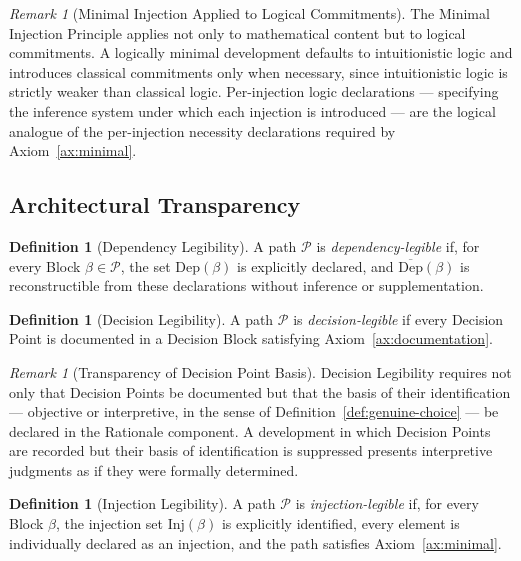 \documentclass[12pt, a4paper]{article}
\theoremstyle{plain}
\theoremstyle{definition}
\newtheorem{definition}[theorem]{Definition}
\theoremstyle{remark}
\newtheorem{remark}[theorem]{Remark}
\newcommand{\Inj}[1]{\mathrm{Inj}(#1)}
\newcommand{\DC}[1]{\overline{\mathrm{Dep}}(#1)}
\begin{document}
\begin{remark}[Minimal Injection Applied to Logical Commitments]
\label{rem:logical-injection}
The Minimal Injection Principle applies not only to mathematical
content but to logical commitments. A logically minimal
development defaults to intuitionistic logic and introduces
classical commitments only when necessary, since intuitionistic
logic is strictly weaker than classical logic. Per-injection
logic declarations --- specifying the inference system under which
each injection is introduced --- are the logical analogue of the
per-injection necessity declarations required by
Axiom~\ref{ax:minimal}.
\end{remark}

\subsection{Architectural Transparency}
\label{subsec:transparency}

\begin{definition}[Dependency Legibility]
\label{def:dep-legible}
A path $\mathcal{P}$ is \emph{dependency-legible} if, for every
Block $\beta \in \mathcal{P}$, the set $\mathrm{Dep}(\beta)$ is
explicitly declared, and $\DC{\beta}$ is reconstructible from these
declarations without inference or supplementation.
\end{definition}

\begin{definition}[Decision Legibility]
\label{def:dec-legible}
A path $\mathcal{P}$ is \emph{decision-legible} if every
Decision Point is documented in a Decision Block satisfying
Axiom~\ref{ax:documentation}.
\end{definition}

\begin{remark}[Transparency of Decision Point Basis]
\label{rem:dec-basis}
Decision Legibility requires not only that Decision Points be
documented but that the basis of their identification ---
objective or interpretive, in the sense of
Definition~\ref{def:genuine-choice} --- be declared in the
Rationale component. A development in which Decision Points are
recorded but their basis of identification is suppressed presents
interpretive judgments as if they were formally determined.
\end{remark}

\begin{definition}[Injection Legibility]
\label{def:inj-legible}
A path $\mathcal{P}$ is \emph{injection-legible} if, for every
Block $\beta$, the injection set $\Inj{\beta}$ is explicitly
identified, every element is individually declared as an
injection, and the path satisfies Axiom~\ref{ax:minimal}.
\end{definition}
\end{document}
